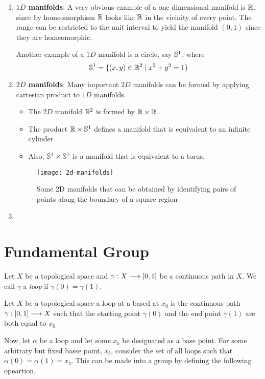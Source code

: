 \begin{enumerate}
    \item \textbf{$1D$ manifolds}: A very obvious example of a one dimensional manifold is $\mathbb{R}$, since by homeomorphism $\mathbb{R}$ looks like $\mathbb{R}$ in the vicinity of every point. The range can be restricted to the unit interval to yield the manifold $(0,1)$ since they are homeomorphic.

    Another example of a $1D$ manifold is a circle, say $\mathbb{S}^1$, where
    \[
        \mathbb{S}^1 = \{(x,y) \in \mathbb{R}^2 \mid x^2 + y^2  = 1\}
    \]
    \item \textbf{$2D$ manifolds}: Many important $2D$ manifolds can be formed by applying cartesian product to $1D$ manifolds. 
    \begin{itemize}
        \item The $2D$ manifold $\mathbb{R}^2$ is formed by $\mathbb{R} \times \mathbb{R}$ 
        \item The product $\mathbb{R} \times \mathbb{S}^1$ defines a manifold that is equivalent to an infinite cylinder
        \item Also, $\mathbb{S}^1 \times \mathbb{S}^1$ is a manifold that is equivalent to a torus.
    \end{itemize}
    \begin{figure}[H]
        \centering
        \texttt{[image: 2d-manifolds]}
        \caption{Some 2D manifolds that can be obtained by identifying pairs of points along the boundary of a square region\cite{lavalle2006planning}}
    \end{figure}
    \item 
\end{enumerate}


\section{Fundamental Group}
\begin{defn}[Loop]
    Let $X$ be a topological space and $\gamma : X \longrightarrow [0,1]$ be a continuous path in $X$. We call $\gamma$ a \textit{loop} if $\gamma(0) = \gamma(1)$.
\end{defn}

\begin{defn}[Loop]\cite{enwiki:fg}
    Let $X$ be a topological space a loop at a based at $x_0$ is the continuous path $\displaystyle \gamma : [0,1] \longrightarrow X$ such that the starting point $\gamma(0)$ and the end point $\gamma(1)$ are both equal to $x_0$
\end{defn}

Now, let $\alpha$ be a loop and let some $x_b$ be designated as a base point. For some arbitrary but fixed basse point, $x_b$, consider the set of all loops such that $\alpha(0) = \alpha(1) = x_b$. This can be made into a group by defining the following opeartion.

